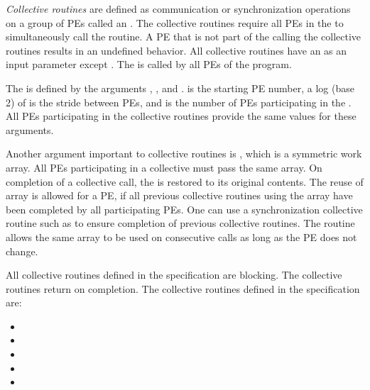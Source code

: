 \emph{Collective routines} are defined as communication or synchronization
operations on a group of \acp{PE} called an \activeset. The collective
routines require all \acp{PE} in the \activeset to simultaneously call the
routine.  A \ac{PE} that is not part of the \activeset calling the collective
routines results in an undefined behavior.  All collective routines have an
\activeset as an input parameter except \barrierall. The \barrierall is
called by all \acp{PE} of the \openshmem program. 

The \activeset is defined by the arguments , ,
and .   is the starting \ac{PE} number, a log (base
2) of  is the stride between \acp{PE}, and  is
the number of \acp{PE} participating in the \activeset.  All \acp{PE}
participating in the collective routines provide the same values for these
arguments. 
 
Another argument important to collective routines is , which is a
symmetric work array.  All \acp{PE} participating in a collective must pass the
same  array.  On completion of a collective call, the  is
restored to its original contents.  The reuse of  array is allowed
for a \ac{PE}, if all previous collective routines using the  array
have been completed by all participating \acp{PE}.  One can use a
synchronization collective routine such as \barrier to ensure completion of
previous collective routines. The  routine allows the same
 array to be used on consecutive calls as long as the \ac{PE}
\activeset does not change. 

All collective routines defined in the specification are blocking.  The
collective routines return on completion.  The collective routines defined in
the \openshmem specification are:

\begin{itemize}
\item[] \broadcast 
\item[] \barrier
\item[] \barrierall
\item[] \collect
\item[] \reduction
\end{itemize} 
